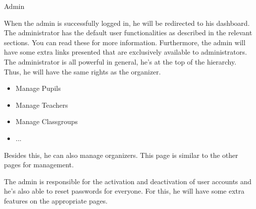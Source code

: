 \begin{section}{Admin}

When the admin is successfully logged in, he will be redirected to his dashboard. The administrator has the default user functionalities as described in the relevant sections. You can read these for more information. Furthermore, the admin will have some extra links presented that are exclusively available to administrators. 
\\

The administrator is all powerful in general, he's at the top of the hierarchy. Thus, he will have the same rights as the organizer.
\begin{itemize}
\item Manage Pupils
\item Manage Teachers
\item Manage Classgroups
\item ...
\end{itemize}

Besides this, he can also manage organizers. This page is similar to the other pages for management. 

The admin is responsible for the activation and deactivation of user accounts and he's also able to reset passwords for everyone. For this, he will have some extra features on the appropriate pages.

\end{section}
